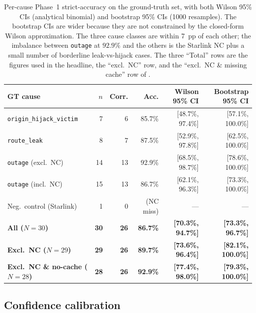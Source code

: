 \begin{table}[t]
\centering
\scriptsize
\setlength{\tabcolsep}{2pt}
\renewcommand{\arraystretch}{1.05}
\begin{tabular}{p{}rrrrr}
\hline
GT cause & $n$ & Corr. & Acc.
& Wilson 95\% CI & Bootstrap 95\% CI \\ \hline
\protect\texttt{origin\_hijack\_victim} & 7 & 6 & 85.7\% & [48.7\%, 97.4\%] & [57.1\%, 100.0\%] \\
\protect\texttt{route\_leak} & 8 & 7 & 87.5\% & [52.9\%, 97.8\%] & [62.5\%, 100.0\%] \\
\protect\texttt{outage} (excl.\ NC) & 14 & 13 & 92.9\% & [68.5\%, 98.7\%] & [78.6\%, 100.0\%] \\
\protect\texttt{outage} (incl.\ NC) & 15 & 13 & 86.7\% & [62.1\%, 96.3\%] & [73.3\%, 100.0\%] \\
Neg.\ control (Starlink) & 1 & 0 & (NC miss) & --- & --- \\
\hline
\textbf{All ($N{=}30$)} & \textbf{30} & \textbf{26} & \textbf{86.7\%} & \textbf{[70.3\%, 94.7\%]} & \textbf{[73.3\%, 96.7\%]} \\
\textbf{Excl.\ NC ($N{=}29$)} & \textbf{29} & \textbf{26} & \textbf{89.7\%} & \textbf{[73.6\%, 96.4\%]} & \textbf{[82.1\%, 100.0\%]} \\
\textbf{Excl.\ NC \& no-cache ($N{=}28$)} & \textbf{28} & \textbf{26} & \textbf{92.9\%} & \textbf{[77.4\%, 98.0\%]} & \textbf{[79.3\%, 100.0\%]} \\
\hline
\end{tabular}

\caption{Per-cause Phase~1 strict-accuracy on the
ground-truth set, with both Wilson 95\% CIs (analytical
binomial) and bootstrap 95\% CIs (1000 resamples).
The bootstrap CIs are wider because they are not
constrained by the closed-form Wilson approximation.
The three cause classes are within 7~pp of each
other; the imbalance between \texttt{outage} at
$92.9\%$ and the others is the Starlink NC plus a
small number of borderline leak-vs-hijack cases.
The three ``Total'' rows are the figures used in
the headline, the ``excl.\ NC'' row, and the
``excl.\ NC \& missing cache'' row of
.}
\label{tab:per-cause}
\end{table}

\subsection{Confidence calibration}
\label{sec:calibration}

